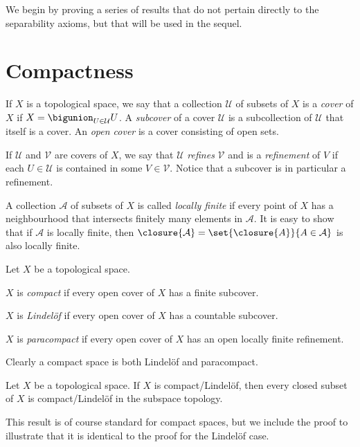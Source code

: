 \documentclass[article, a4paper, 11pt, oneside]{memoir}
\numberwithin{equation}{chapter}
\newcommand{\calU}{\mathcal{U}}
\newcommand{\calV}{\mathcal{V}}
\begin{document}
We begin by proving a series of results that do not pertain directly to the separability axioms, but that will be used in the sequel.


\section{Compactness}

\newcommand{\calA}{\mathcal{A}}

If $X$ is a topological space, we say that a collection $\calU$ of subsets of $X$ is a \emph{cover} of $X$ if $X = \bigunion_{U \in \calU} U$. A \emph{subcover} of a cover $\calU$ is a subcollection of $\calU$ that itself is a cover. An \emph{open cover} is a cover consisting of open sets.

If $\calU$ and $\calV$ are covers of $X$, we say that $\calU$ \emph{refines} $\calV$ and is a \emph{refinement} of $V$ if each $U \in \calU$ is contained in some $V \in \calV$. Notice that a subcover is in particular a refinement.

A collection $\calA$ of subsets of $X$ is called \emph{locally finite} if every point of $X$ has a neighbourhood that intersects finitely many elements in $\calA$. It is easy to show that if $\calA$ is locally finite, then $\closure{\calA} = \set{\closure{A}}{A \in \calA}$ is also locally finite.

\begin{definition}
    Let $X$ be a topological space.
    \begin{enumdef}
        \item $X$ is \emph{compact} if every open cover of $X$ has a finite subcover.

        \item $X$ is \emph{Lindelöf} if every open cover of $X$ has a countable subcover.

        \item $X$ is \emph{paracompact} if every open cover of $X$ has an open locally finite refinement.
    \end{enumdef}
\end{definition}
%
Clearly a compact space is both Lindelöf and paracompact.


\begin{proposition}
    \label{thm:compact-Lindelof-closed-subset}
    Let $X$ be a topological space. If $X$ is compact/Lindelöf, then every closed subset of $X$ is compact/Lindelöf in the subspace topology.
\end{proposition}
%
This result is of course standard for compact spaces, but we include the proof to illustrate that it is identical to the proof for the Lindelöf case.
\end{document}
